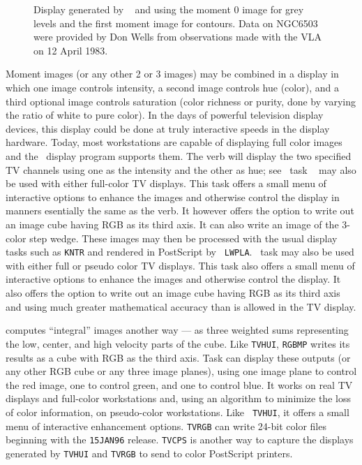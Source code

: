 \begin{figure}
\centering
\caption[Images of line-cube moments.]{Display generated by {\tt
{}} and {\tt {}} using the moment 0 image for grey
levels and the first moment image for contours.  Data on NGC6503 were
provided by Don Wells from observations made with the VLA on 12 April
1983. }
\label{fig:linemom}
\end{figure}

     Moment images (or any other 2 or 3 images) may be combined in a
display in which one image controls intensity, a second image controls
hue (color), and a third optional image controls saturation (color
richness or purity, done by varying the ratio of white to pure color).
In the days of powerful television display devices, this display could
be done at truly interactive speeds in the display hardware.  Today,
most workstations are capable of displaying full color images and the
\AIPS\ display program supports them.  The verb {\tt {}}
will display the two specified TV channels using one as the intensity
and the other as hue; see   \AIPS\ task {\tt
{}} may also be used with either full-color TV displays.
This task offers a small menu of interactive options to enhance the
images and otherwise control the display in manners esentially the
same as the verb.  It however offers the option to write out an image
cube having RGB as its third axis. It can also write an image of the
3-color step wedge.  These images may then be processed with the usual
display tasks such as {\tt KNTR} and rendered in PostScript by {\tt
LWPLA}\@.  \AIPS\ task {\tt {}} may also be used with either
full or pseudo color TV displays.  This task also offers a small menu
of interactive options to enhance the images and otherwise control the
display.  It also offers the option to write out an image cube having
RGB as its third axis and using much greater mathematical accuracy
than is allowed in the TV display.

  {\tt {}} computes ``integral'' images another way --- as
three weighted sums representing the low, center, and high velocity
parts of the cube.  Like {\tt TVHUI}, {\tt RGBMP} writes its results
as a cube with RGB as the third axis.  Task {\tt {}} can
display these outputs (or any other RGB cube or any three image
planes), using one image plane to control the red image, one to
control green, and one to control blue.  It works on real TV displays
and full-color workstations and, using an algorithm to minimize the
loss of color information, on pseudo-color workstations.  Like {\tt
TVHUI}, it offers a small menu of interactive enhancement options.
{\tt TVRGB} can write 24-bit color  files beginning
with the {\tt 15JAN96} release. {\tt TVCPS} is another way to capture
the displays generated by {\tt TVHUI} and {\tt TVRGB} to send to color
PostScript printers.

